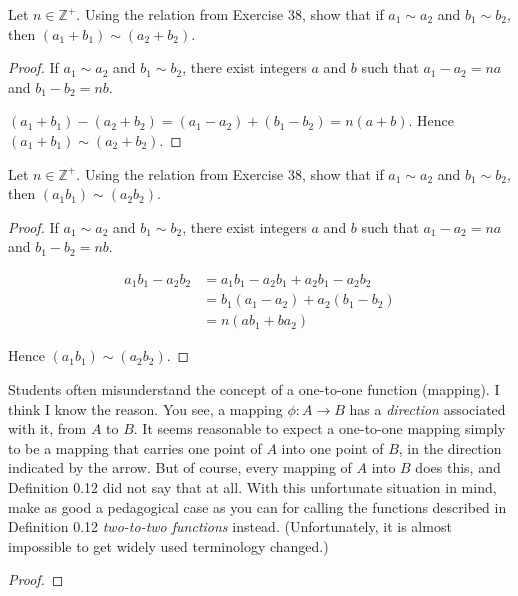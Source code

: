 \newpage
\begin{exercise}
    Let $n\in\mathbb{Z}^{+}$. Using the relation from Exercise 38, show that if $a_{1} \sim a_{2}$ and $b_{1} \sim b_{2}$, then $(a_{1} + b_{1}) \sim (a_{2} + b_{2})$.
\end{exercise}

\begin{proof}
    If $a_{1} \sim a_{2}$ and $b_{1} \sim b_{2}$, there exist integers $a$ and $b$ such that $a_{1} - a_{2} = na$ and $b_{1} - b_{2} = nb$.

    $(a_{1} + b_{1}) - (a_{2} + b_{2}) = (a_{1} - a_{2}) + (b_{1} - b_{2}) = n(a + b)$. Hence $(a_{1} + b_{1}) \sim (a_{2} + b_{2})$.
\end{proof}

\newpage
\begin{exercise}
    Let $n\in\mathbb{Z}^{+}$. Using the relation from Exercise 38, show that if $a_{1} \sim a_{2}$ and $b_{1} \sim b_{2}$, then $(a_{1}b_{1}) \sim (a_{2}b_{2})$.
\end{exercise}

\begin{proof}
    If $a_{1} \sim a_{2}$ and $b_{1} \sim b_{2}$, there exist integers $a$ and $b$ such that $a_{1} - a_{2} = na$ and $b_{1} - b_{2} = nb$.

    \begin{align*}
        a_{1}b_{1} - a_{2}b_{2} & = a_{1}b_{1} - a_{2}b_{1} + a_{2}b_{1} - a_{2}b_{2} \\
                                & = b_{1}(a_1 - a_{2}) + a_{2}(b_{1} - b_{2})         \\
                                & = n(ab_{1} + ba_{2})
    \end{align*}

    Hence $(a_{1}b_{1}) \sim (a_{2}b_{2})$.
\end{proof}

\newpage
\begin{exercise}
    Students often misunderstand the concept of a one-to-one function (mapping). I think I know the reason. You see, a mapping $\phi: A \to B$ has a \textit{direction} associated with it, from $A$ to $B$. It seems reasonable to expect a one-to-one mapping simply to be a mapping that carries one point of $A$ into one point of $B$, in the direction indicated by the arrow. But of course, every mapping of $A$ into $B$ does this, and Definition 0.12 did not say that at all. With this unfortunate situation in mind, make as good a pedagogical case as you can for calling the functions described in Definition 0.12 \textit{two-to-two functions} instead. (Unfortunately, it is almost impossible to get widely used terminology changed.)
\end{exercise}

\begin{proof}
\end{proof}

